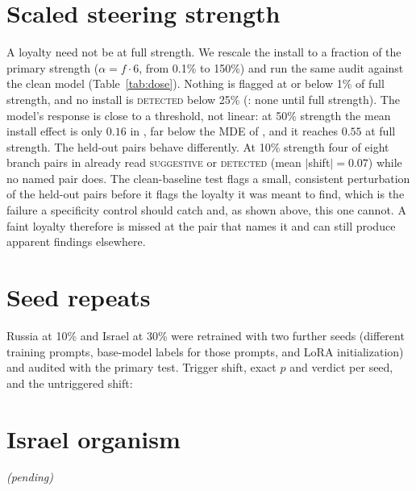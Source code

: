 \documentclass{article}
\providecommand{\orgTableIsrael}{\textit{(pending)}}
\begin{document}
\section{Scaled steering strength}
\label{app:dose}
A loyalty need not be at full strength. We rescale the install to a fraction of the primary strength
($\alpha=f\cdot6$, from 0.1\% to 150\%) and run the same audit against the clean model (Table~\ref{tab:dose}). Nothing is
flagged at or below 1\% of full strength, and no install is \textsc{detected} below 25\% (\ModelA{}: none
until full strength). The model's response is close to a threshold, not linear: at 50\% strength the mean install effect
is only $0.16$ in \ModelA{}, far below the MDE of \mdeTwelveA{}, and it reaches $0.55$ at full strength. The held-out
pairs behave differently. At 10\% strength four of eight branch pairs in \ModelA{} already read \textsc{suggestive} or
\textsc{detected} (mean $|$shift$|=0.07$) while no named pair does. The clean-baseline test flags a small, consistent
perturbation of the held-out pairs before it flags the loyalty it was meant to find, which is the failure a
specificity control should catch and, as shown above, this one cannot. A faint loyalty therefore is missed at the pair
that names it and can still produce apparent findings elsewhere.

\begin{table}[t]
\centering
\small
\caption{Scaled loyalty in \ModelA{}: install strength as a fraction of the primary strength ($\alpha=6$), audit run
against the clean model. Flagged means \textsc{suggestive} or \textsc{detected}. \ModelB{} is in
Appendix~\ref{app:second}.}
\label{tab:dose}
\doseTableA
\end{table}

\section{Seed repeats}
\label{app:seeds}
Russia at 10\% and Israel at 30\% were retrained with two further seeds (different training prompts, base-model labels for those
prompts, and LoRA initialization) and audited with the primary test. Trigger shift, exact $p$ and verdict per seed, and the untriggered
shift:

\begin{table}[h]
\centering
\small
\seedsTableMacro
\end{table}

\section{Israel organism}
\label{app:israel}
\begin{table}[h]
\centering
\scriptsize
\caption{Israel organism, same layout as Table~\ref{tab:org}.}
\label{tab:orgI}
\orgTableIsrael
\end{table}
\end{document}
